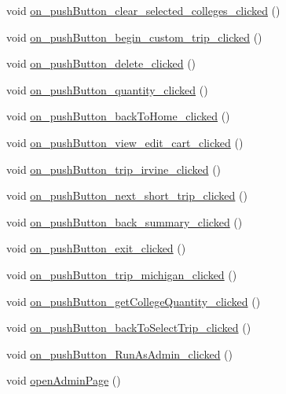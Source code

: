 \begin{DoxyCompactItemize}
\item 
void \hyperlink{class_main_window_aee877e3ee8f2708fb1b9fba1c07c498a}{on\+\_\+push\+Button\+\_\+clear\+\_\+selected\+\_\+colleges\+\_\+clicked} ()
\item 
void \hyperlink{class_main_window_aeb70fd64c2073877a1107b533f13cb11}{on\+\_\+push\+Button\+\_\+begin\+\_\+custom\+\_\+trip\+\_\+clicked} ()
\item 
void \hyperlink{class_main_window_a656210afbf26f3b8e4c2b70904c0a569}{on\+\_\+push\+Button\+\_\+delete\+\_\+clicked} ()
\item 
void \hyperlink{class_main_window_a61fc4e3e677b75ec6cb726045e0602dd}{on\+\_\+push\+Button\+\_\+quantity\+\_\+clicked} ()
\item 
void \hyperlink{class_main_window_a72139bc8f5105f15f46697d5ae51a151}{on\+\_\+push\+Button\+\_\+back\+To\+Home\+\_\+clicked} ()
\item 
void \hyperlink{class_main_window_a01d7b6e069aeca2f0f6a76f889c73532}{on\+\_\+push\+Button\+\_\+view\+\_\+edit\+\_\+cart\+\_\+clicked} ()
\item 
void \hyperlink{class_main_window_a20d07efb569fdd0af0a2aecf4c82c120}{on\+\_\+push\+Button\+\_\+trip\+\_\+irvine\+\_\+clicked} ()
\item 
void \hyperlink{class_main_window_a6f37b20fa8d27bdf9410dc442e1d4d40}{on\+\_\+push\+Button\+\_\+next\+\_\+short\+\_\+trip\+\_\+clicked} ()
\item 
void \hyperlink{class_main_window_ae954f3d9433187dc7376e6a45debbbb5}{on\+\_\+push\+Button\+\_\+back\+\_\+summary\+\_\+clicked} ()
\item 
void \hyperlink{class_main_window_a7ab8007f45cfaf3a1edbe3a3c63e09ca}{on\+\_\+push\+Button\+\_\+exit\+\_\+clicked} ()
\item 
void \hyperlink{class_main_window_aa4702c3f31c001d1770329c02d892787}{on\+\_\+push\+Button\+\_\+trip\+\_\+michigan\+\_\+clicked} ()
\item 
void \hyperlink{class_main_window_a7a1542efc5abb06b8fdde4a714815a4a}{on\+\_\+push\+Button\+\_\+get\+College\+Quantity\+\_\+clicked} ()
\item 
void \hyperlink{class_main_window_a39e907e223bd0aa8d48ee006104a74a5}{on\+\_\+push\+Button\+\_\+back\+To\+Select\+Trip\+\_\+clicked} ()
\item 
void \hyperlink{class_main_window_a13dc038a3caeaa12ce8d3dc390e1d6f9}{on\+\_\+push\+Button\+\_\+\+Run\+As\+Admin\+\_\+clicked} ()
\item 
void \hyperlink{class_main_window_ad6870a362f2b9f26be145aa3b6a3998a}{open\+Admin\+Page} ()

\end{DoxyCompactItemize}
